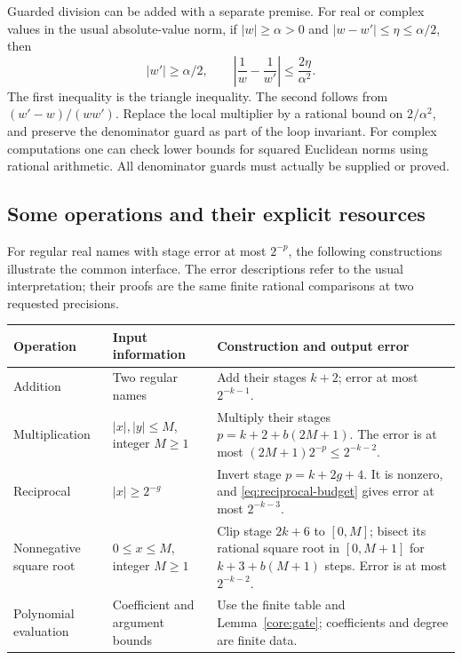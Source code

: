 Guarded division can be added with a separate premise.  For real or complex
values in the usual absolute-value norm, if
\(|w|\ge\alpha>0\) and \(|w-w'|\le\eta\le\alpha/2\), then
\begin{equation}\label{eq:reciprocal-budget}
 |w'|\ge\alpha/2,\qquad
 \left|\frac1w-\frac1{w'}\right|\le\frac{2\eta}{\alpha^2}.
\end{equation}
The first inequality is the triangle inequality.  The second follows
from \((w'-w)/(ww')\).  Replace the local multiplier by a rational bound
on \(2/\alpha^2\), and preserve the denominator guard as part of the loop
invariant.  For complex computations one can check lower bounds for
squared Euclidean norms using rational arithmetic.  All denominator
guards must actually be supplied or proved.

\subsection{Some operations and their explicit resources}

For regular real names with stage error at most \(2^{-p}\), the following
constructions illustrate the common interface.  The error descriptions
refer to the usual interpretation; their proofs are the same finite
rational comparisons at two requested precisions.
\begin{center}\small
\begin{tabular}{@{}P{.18\linewidth}P{.25\linewidth}P{.48\linewidth}@{}}
\toprule
Operation & Input information & Construction and output error\\
\midrule
Addition & Two regular names & Add their stages \(k+2\); error at most
\(2^{-k-1}\).\\
Multiplication & \(|x|,|y|\le M\), integer \(M\ge1\) & Multiply their
stages \(p=k+2+b(2M+1)\).  The error is at most
\((2M+1)2^{-p}\le2^{-k-2}\).\\
Reciprocal & \(|x|\ge2^{-g}\) & Invert stage \(p=k+2g+4\).
It is nonzero, and \eqref{eq:reciprocal-budget} gives error at most
\(2^{-k-3}\).\\
Nonnegative square root & \(0\le x\le M\), integer \(M\ge1\) & Clip stage
\(2k+6\) to \([0,M]\); bisect its rational square root in \([0,M+1]\)
for \(k+3+b(M+1)\) steps.  Error is at most \(2^{-k-2}\).\\
Polynomial evaluation & Coefficient and argument bounds & Use the finite
table and Lemma~\ref{core:gate}; coefficients and degree are finite data.\\
\bottomrule
\end{tabular}
\end{center}

